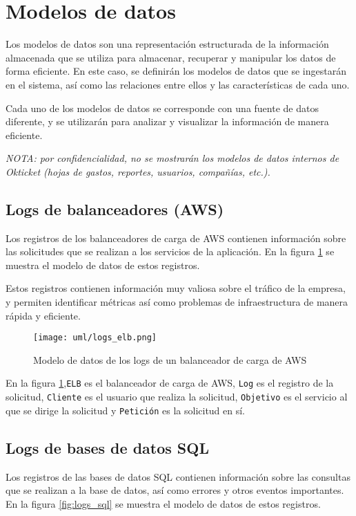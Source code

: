 \section{Modelos de datos}\label{sec:modelo}
Los modelos de datos son una representación estructurada de la información
almacenada que se utiliza para almacenar, recuperar y manipular los datos de
forma eficiente. En este caso, se definirán los modelos de datos que se
ingestarán en el sistema, así como las relaciones entre ellos y las
características de cada uno.

Cada uno de los modelos de datos se corresponde con una fuente de datos
diferente, y se utilizarán para analizar y visualizar la información de manera
eficiente.

\emph{NOTA: por confidencialidad, no se mostrarán los modelos de datos internos
de Okticket (hojas de gastos, reportes, usuarios, compañías, etc.).}


\newpage{}
\subsection{Logs de balanceadores (AWS)}
Los registros de los balanceadores de carga de AWS contienen información
sobre las solicitudes que se realizan a los servicios de la aplicación. En la
figura \ref{fig:logs_elb} se muestra el modelo de datos de estos registros.

Estos registros contienen información muy valiosa sobre el tráfico de la
empresa, y permiten identificar métricas así como problemas de infraestructura
de manera rápida y eficiente.

\begin{figure}[H]
	\centering
	\texttt{[image: uml/logs\_elb.png]}
	\caption{Modelo de datos de los logs de un balanceador de carga de AWS}
	\label{fig:logs_elb}
\end{figure}

En la figura \ref{fig:logs_elb},\texttt{ELB} es el balanceador de carga de AWS,
\texttt{Log} es el registro de la solicitud, \texttt{Cliente} es el usuario que
realiza la solicitud, \texttt{Objetivo} es el servicio al que se dirige la
solicitud y \texttt{Petición} es la solicitud en sí.


\newpage{}
\subsection{Logs de bases de datos SQL}
Los registros de las bases de datos SQL contienen información sobre las
consultas que se realizan a la base de datos, así como errores y otros eventos
importantes. En la figura \ref{fig:logs_sql} se muestra el modelo de datos de
estos registros.

